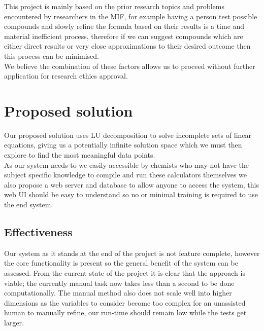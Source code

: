 This project is mainly based on the prior research topics and problems encountered by researchers in the MIF, for example having a person test possible compounds and slowly refine the formula based on their results is a time and material inefficient process, therefore if we can suggest compounds which are either direct results or very close approximations to their desired outcome then this process can be minimised. \\

We believe the combination of these factors allows us to proceed without further application for research ethics approval.

\section{Proposed solution}
Our proposed solution uses LU decomposition to solve incomplete sets of linear equations, giving us a potentially infinite solution space which we must then explore to find the most meaningful data points. \\

As our system needs to we easily accessible by chemists who may not have the subject specific knowledge to compile and run these calculators themselves we also propose a web server and database to allow anyone to access the system, this web UI should be easy to understand so no or minimal training is required to use the end system.

\subsection{Effectiveness}
Our system as it stands at the end of the project is not feature complete, however the core functionality is present so the general benefit of the system can be assessed. From the current state of the project it is clear that the approach is viable; the currently manual task now takes less than a second to be done computationally. The manual method also does not scale well into higher dimensions as the variables to consider become too complex for an unassisted human to manually refine, our run-time should remain low while the tests get larger.